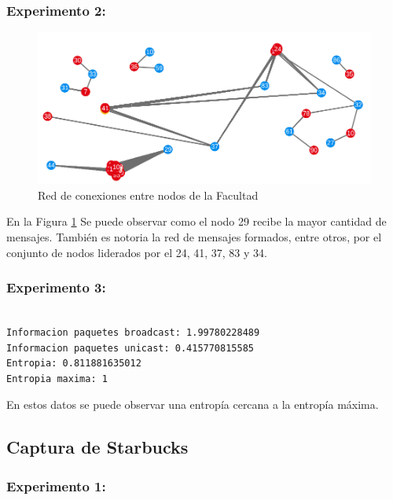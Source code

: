 \subsubsection{Experimento 2:}

\begin{figure}[H]
  \centering
    \includegraphics[scale=0.6]{imagenes/graficos/grafos/facultad.png}
  \caption{Red de conexiones entre nodos de la Facultad}
  \label{fig:9}
\end{figure}

En la Figura \ref{fig:9} Se puede observar como el nodo 29 recibe la mayor cantidad de mensajes. También es notoria la red de mensajes formados, entre otros, por el conjunto de nodos liderados por el 24, 41, 37, 83 y 34.

\subsubsection{Experimento 3:}
\begin{verbatim}

Informacion paquetes broadcast: 1.99780228489
Informacion paquetes unicast: 0.415770815585
Entropia: 0.811881635012
Entropia maxima: 1

\end{verbatim}

En estos datos se puede observar una entropía cercana a la entropía máxima.

\newpage
\subsection{Captura de Starbucks}

\subsubsection{Experimento 1:}


